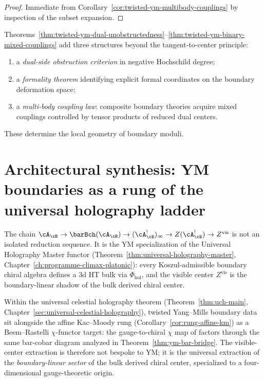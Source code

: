 \begin{proof}
Immediate from Corollary~\ref{cor:twisted-ym-multibody-couplings} by inspection of the subset expansion.
\end{proof}

\begin{remark}
\label{rem:twisted-ym-why-new}
Theorems~\ref{thm:twisted-ym-dual-unobstructedness}--\ref{thm:twisted-ym-binary-mixed-couplings} add three structures beyond the tangent-to-center principle:
\begin{enumerate}[label=(\roman*)]
\item a \emph{dual-side obstruction criterion} in negative Hochschild degree;
\item a \emph{formality theorem} identifying explicit formal coordinates on the boundary deformation space;
\item a \emph{multi-body coupling law}: composite boundary theories acquire mixed couplings controlled by tensor products of reduced dual centers.
\end{enumerate}
These determine the local geometry of boundary moduli.
\end{remark}

\section{Architectural synthesis: YM boundaries as a rung of the universal holography ladder}
\label{sec:ym-holography-rung-synthesis}

The chain
$\cA_{\cB} \to \barBch(\cA_{\cB}) \to (\cA_{\cB}^!)_\infty \to Z(\cA_{\cB}^!) \to Z^{\mathrm{vis}}$
is not an isolated reduction sequence. It is the YM specialization of the Universal
Holography Master functor (Theorem~\ref{thm:universal-holography-master},
Chapter~\ref{ch:programme-climax-platonic}): every Koszul-admissible boundary
chiral algebra defines a 3d HT bulk via $\Phi_{\mathrm{hol}}$, and the visible
center $Z^{\mathrm{vis}}$ is the boundary-linear shadow of the bulk derived
chiral center.

\begin{remark}
\label{rem:ym-holography-rung-anchor}
Within the universal celestial holography theorem
(Theorem~\ref{thm:uch-main}, Chapter~\ref{sec:universal-celestial-holography}),
twisted Yang--Mills boundary data sit alongside the affine Kac--Moody rung
(Corollary~\ref{cor:rung-affine-km}) as a Beem--Rastelli $\chi$-functor target:
the gauge-to-chiral $\chi$ map of \cite{BR15} factors through the same bar-cobar
diagram analyzed in Theorem~\ref{thm:ym-bar-bridge}. The visible-center
extraction is therefore not bespoke to YM; it is the universal extraction of
the \emph{boundary-linear sector} of the bulk derived chiral center, specialized
to a four-dimensional gauge-theoretic origin.
\end{remark}

